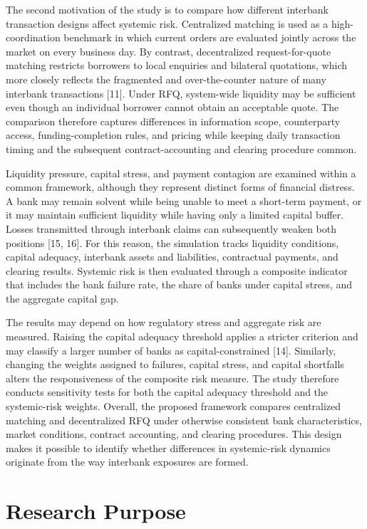 The second motivation of the study is to compare how different interbank
transaction designs affect systemic risk. Centralized matching is used
as a high-coordination benchmark in which current orders are evaluated
jointly across the market on every business day. By contrast,
decentralized request-for-quote matching restricts borrowers to local
enquiries and bilateral quotations, which more closely reflects the fragmented and
over-the-counter nature of many interbank transactions {[}11{]}. Under
RFQ, system-wide liquidity may be sufficient even though an individual
borrower cannot obtain an acceptable quote. The comparison therefore
captures differences in information scope, counterparty access,
funding-completion rules, and pricing while keeping daily transaction timing and
the subsequent contract-accounting and clearing procedure common.

Liquidity pressure, capital stress, and payment contagion are examined
within a common framework, although they represent distinct forms of
financial distress. A bank may remain solvent while being unable to meet
a short-term payment, or it may maintain sufficient liquidity while
having only a limited capital buffer. Losses transmitted through
interbank claims can subsequently weaken both positions {[}15, 16{]}.
For this reason, the simulation tracks liquidity conditions, capital
adequacy, interbank assets and liabilities, contractual payments, and
clearing results. Systemic risk is then evaluated through a composite
indicator that includes the bank failure rate, the share of banks under
capital stress, and the aggregate capital gap.

The results may depend on how regulatory stress and aggregate risk are
measured. Raising the capital adequacy threshold applies a stricter
criterion and may classify a larger number of banks as
capital-constrained {[}14{]}. Similarly, changing the weights assigned to
failures, capital stress, and capital shortfalls alters the
responsiveness of the composite risk measure. The study therefore
conducts sensitivity tests for both the capital adequacy threshold and
the systemic-risk weights. Overall, the proposed framework compares
centralized matching and decentralized RFQ under otherwise consistent
bank characteristics, market conditions, contract accounting, and
clearing procedures. This design makes it possible to identify whether
differences in systemic-risk dynamics originate from the way interbank
exposures are formed.

\section{Research Purpose}

